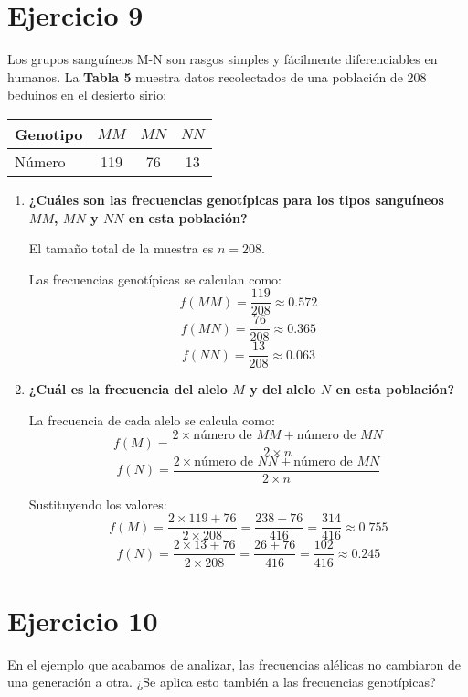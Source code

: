 \documentclass{article}
\begin{document}
\section*{Ejercicio 9}

Los grupos sanguíneos M-N son rasgos simples y fácilmente diferenciables en humanos. La \textbf{Tabla 5} muestra datos recolectados de una población de 208 beduinos en el desierto sirio:

\begin{center}
\begin{tabular}{lccc}
\hline
Genotipo & $MM$ & $MN$ & $NN$ \\
\hline
Número   & 119  & 76   & 13   \\
\hline
\end{tabular}
\end{center}

\begin{enumerate}[label=\alph*)]
    \item \textbf{¿Cuáles son las frecuencias genotípicas para los tipos sanguíneos $MM$, $MN$ y $NN$ en esta población?}

    El tamaño total de la muestra es $n = 208$.

    Las frecuencias genotípicas se calculan como:
    \[
    f(MM) = \frac{119}{208} \approx 0.572
    \]
    \[
    f(MN) = \frac{76}{208} \approx 0.365
    \]
    \[
    f(NN) = \frac{13}{208} \approx 0.063
    \]

    \item \textbf{¿Cuál es la frecuencia del alelo $M$ y del alelo $N$ en esta población?}

    La frecuencia de cada alelo se calcula como:
    \[
    f(M) = \frac{2 \times \text{número de } MM + \text{número de } MN}{2 \times n}
    \]
    \[
    f(N) = \frac{2 \times \text{número de } NN + \text{número de } MN}{2 \times n}
    \]

    Sustituyendo los valores:
    \[
    f(M) = \frac{2 \times 119 + 76}{2 \times 208} = \frac{238 + 76}{416} = \frac{314}{416} \approx 0.755
    \]
    \[
    f(N) = \frac{2 \times 13 + 76}{2 \times 208} = \frac{26 + 76}{416} = \frac{102}{416} \approx 0.245
    \]
\end{enumerate}
\section*{Ejercicio 10}

En el ejemplo que acabamos de analizar, las frecuencias alélicas no cambiaron de una generación a otra.  
¿Se aplica esto también a las frecuencias genotípicas?
\end{document}
